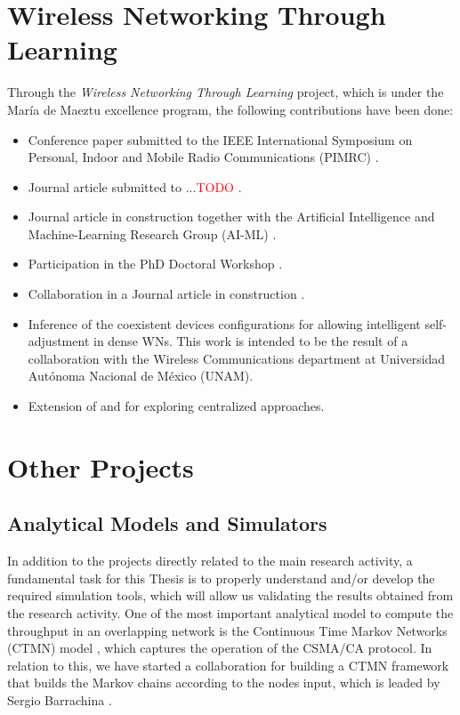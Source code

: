 \documentclass[12pt, a4paper,twoside]{tesi_upf}
\begin{document}
		\section{Wireless Networking Through Learning}
		\label{section:mdm}		
			Through the \textit{Wireless Networking Through Learning} project, which is under the Mar\'ia de Maeztu excellence program, the following contributions have been done:
			\begin{itemize}
				\item Conference paper submitted to the IEEE International Symposium on Personal, Indoor and Mobile Radio Communications (PIMRC) \cite{wilhelmi2017implications}.
				\item Journal article submitted to ...\textcolor{red}{TODO} \cite{wilhelmi2017enhancing}.
				\item Journal article in construction together with the Artificial Intelligence and Machine-Learning Research Group (AI-ML) \cite{bellalta2017learning}.
				\item Participation in the PhD Doctoral Workshop \cite{wilhelmi2017improving}.
				\item Collaboration in a Journal article in construction \cite{barrachina2017ctmn}.
				\item Inference of the coexistent devices configurations for allowing intelligent self-adjustment in dense WNs. This work is intended to be the result of a collaboration with the Wireless Communications department at Universidad Aut\'onoma Nacional de M\'exico (UNAM).
				\item Extension of \cite{wilhelmi2017enhancing} and \cite{wilhelmi2017implications} for exploring centralized approaches.
			\end{itemize}	
			
		\section{Other Projects}
		\label{section:other_projects}	
			\subsection{Analytical Models and Simulators}
			\label{section:validation}	
				In addition to the projects directly related to the main research activity, a fundamental task for this Thesis is to properly understand and/or develop the required simulation tools, which will allow us validating the results obtained from the research activity. One of the most important analytical model to compute the throughput in an overlapping network is the Continuous Time Markov Networks (CTMN) model \cite{bellalta2014throughput}, which captures the operation of the CSMA/CA protocol. In relation to this, we have started a collaboration for building a CTMN framework that builds the Markov chains according to the nodes input, which is leaded by Sergio Barrachina \cite{barrachina2017ctmn}. 
				
\end{document}
